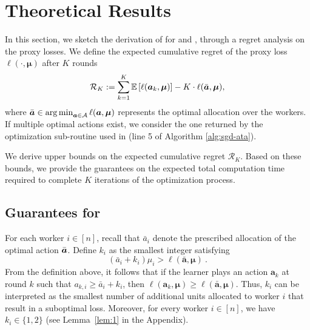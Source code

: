 \section{Theoretical Results}
\label{section:theory}

In this section, we sketch the derivation of  for  and , through a regret analysis on the proxy losses.
We define the expected cumulative regret of the proxy loss $\ell(\cdot, \bm{\mu})$ after $K$ rounds
\begin{equation}\label{eq:proxy_loss}
	\mathcal{R}_K := \sum \limits_{k=1}^{K} \mathbb{E}\left[\ell(\bm{a}_k, \bm{\mu})\right] - K \cdot \ell(\bar{\bm{a}}, \bm{\mu}),
\end{equation}
where $\bar{\bm{a}} \in \operatorname*{arg\,min}_{\bm{a} \in \mathcal{A}} \ell(\bm{a}, \bm{\mu})$ represents the optimal allocation over the workers. If multiple optimal actions exist, we consider the one returned by the optimization sub-routine used in  (line 5 of Algorithm \ref{alg:sgd-ata}).

We derive upper bounds on the expected cumulative regret $\mathcal{R}_K$. Based on these bounds, we provide the guarantees on the expected total computation time required to complete $K$ iterations of the optimization process.

\subsection{Guarantees for }

For each worker $i \in [n]$, recall that $\bar{a}_i$ denote the prescribed allocation of the optimal action $\bar{\bm{a}}$. Define $k_i$ as the smallest integer satisfying
\begin{equation}\label{def:ki}
	(\bar{a}_i + k_i) \mu_i > \ell(\bar{\bm{a}}, \bm{\mu})~.
\end{equation}
From the definition above, it follows that if the learner plays an action $\bm{a}_k$ at round $k$ such that $a_{k,i} \ge \bar{a}_i + k_i$, then $\ell(\bm{a}_k, \bm{\mu}) \ge \ell(\bar{\bm{a}}, \bm{\mu})$. Thus, $k_i$ can be interpreted as the smallest number of additional units allocated to worker $i$ that result in a suboptimal loss. Moreover, for every worker $i \in [n]$, we have $k_{i} \in \{1, 2\}$ (see Lemma~\ref{lem:1} in the Appendix).

